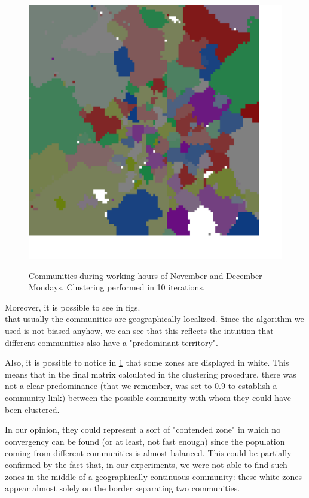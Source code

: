 \documentclass[12pt,a4paper]{article}
\begin{document}
\begin{figure}[H]
\includegraphics[width=\linewidth]{week/1Mon.png}
\label{fig:mondayworking}
\caption{Communities during working hours of November and December Mondays. Clustering performed in 10 iterations.}
\end{figure}

Moreover, it is possible to see in figs. \\
that usually the communities are geographically localized. Since the algorithm we used is not biased anyhow, we can see
that this reflects the intuition that different communities also have a "predominant territory".

Also, it is possible to notice in \ref{fig:mondayworking} that some zones are displayed in white. This means that in the final matrix calculated in the clustering procedure, there was not a clear predominance (that we remember, was set to 0.9 to establish a community link) between the possible community with whom they could have been clustered.

In our opinion, they could represent a sort of "contended zone" in which no convergency can be found (or at least, not fast enough) since the population coming from different communities is almost balanced. This could be partially confirmed by the fact that, in our experiments,
we were not able to find such zones in the middle of a geographically continuous community: these white zones appear almost solely on the border separating two communities.
\end{document}
